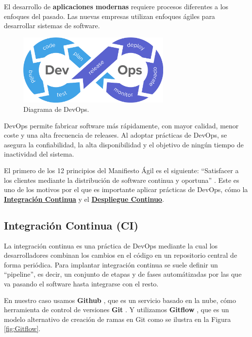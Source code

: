 \documentclass[12pt,twoside,titlepage]{report}
\begin{document}
El desarrollo de \textbf{aplicaciones modernas} requiere procesos diferentes a los enfoques del pasado. Las nuevas empresas utilizan enfoques ágiles para desarrollar sistemas de software.
\cite{devops1}

\begin{figure}[H]
    \centering
    \includegraphics[width=0.68\textwidth]{DevOps/DevOps}
    \caption{Diagrama de DevOps.}
    \label{fig:DevOps}
\end{figure}

DevOps permite fabricar software más rápidamente, con mayor calidad, menor coste y una alta frecuencia de releases. Al adoptar prácticas de DevOps, se asegura la confiabilidad, la alta disponibilidad y el objetivo de ningún tiempo de inactividad del sistema.

El primero de los 12 principios del Manifiesto Ágil es el siguiente: ``Satisfacer a los clientes mediante la distribución de software continua y oportuna'' \cite{manifiestoAgil}. Este es uno de los motivos por el que es importante aplicar prácticas de DevOps, cómo la \hyperref[sec:ic]{\textbf{Integración Continua}} y el \hyperref[sec:dc]{\textbf{Despliegue Continuo}}.
\cite{devops2}

\subsection{Integración Continua (CI)}
\label{sec:ic}

La integración continua es una práctica de DevOps mediante la cual los desarrolladores combinan los cambios en el código en un repositorio central de forma periódica. Para implantar integración continua se suele definir un ``pipeline'', es decir, un conjunto de etapas y de fases automátizadas por las que va pasando el software hasta integrarse con el resto. 
\cite{ic}

En nuestro caso usamos \textbf{Github} \cite{github}, que es un servicio basado en la nube, cómo herramienta de control de versiones \textbf{Git} \cite{git}. Y utilizamos \textbf{Gitflow} \cite{gitflow}, que es un modelo alternativo de creación de ramas en Git como se ilustra en la Figura \ref{fig:Gitflow}.
\end{document}
